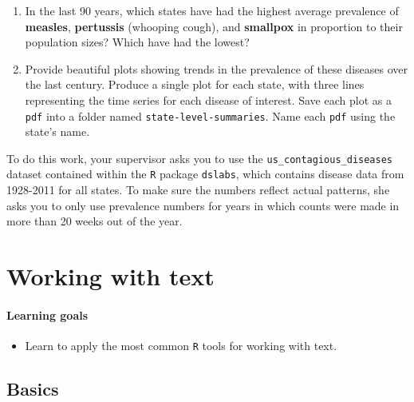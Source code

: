 \documentclass[
]{book}
\providecommand{\tightlist}{%
  \setlength{\itemsep}{0pt}\setlength{\parskip}{0pt}}
\begin{document}
\begin{enumerate}
\def\labelenumi{\arabic{enumi}.}
\item
  In the last 90 years, which states have had the highest average prevalence of \textbf{measles}, \textbf{pertussis} (whooping cough), and \textbf{smallpox} in proportion to their population sizes? Which have had the lowest?
\item
  Provide beautiful plots showing trends in the prevalence of these diseases over the last century. Produce a single plot for each state, with three lines representing the time series for each disease of interest. Save each plot as a \texttt{pdf} into a folder named \texttt{state-level-summaries}. Name each \texttt{pdf} using the state's name.
\end{enumerate}

To do this work, your supervisor asks you to use the \texttt{us\_contagious\_diseases} dataset contained within the \texttt{R} package \texttt{dslabs}, which contains disease data from 1928-2011 for all states. To make sure the numbers reflect actual patterns, she asks you to only use prevalence numbers for years in which counts were made in more than 20 weeks out of the year.

\hypertarget{text}{%
\chapter{Working with text}\label{text}}

\hypertarget{learning-goals-18}{%
\subsubsection*{Learning goals}\label{learning-goals-18}}

\begin{itemize}
\tightlist
\item
  Learn to apply the most common \texttt{R} tools for working with text.
\end{itemize}

\hypertarget{basics-1}{%
\section*{Basics}\label{basics-1}}
\end{document}
